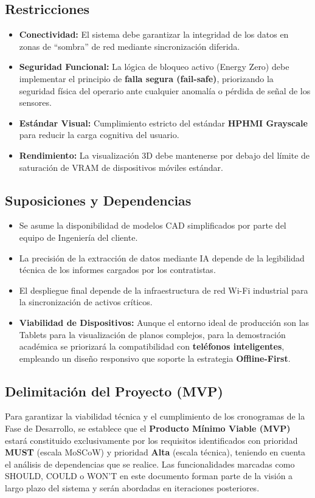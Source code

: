 \subsection{Restricciones}

\begin{itemize}
    \item \textbf{Conectividad:} El sistema debe garantizar la integridad de los datos en zonas de ``sombra'' de red mediante sincronización diferida.
    \item \textbf{Seguridad Funcional:} La lógica de bloqueo activo (Energy Zero) debe implementar el principio de \textbf{falla segura (fail-safe)}, priorizando la seguridad física del operario ante cualquier anomalía o pérdida de señal de los sensores.
    \item \textbf{Estándar Visual:} Cumplimiento estricto del estándar \textbf{HPHMI Grayscale} para reducir la carga cognitiva del usuario.
    \item \textbf{Rendimiento:} La visualización 3D debe mantenerse por debajo del límite de saturación de VRAM de dispositivos móviles estándar.
\end{itemize}
\subsection{Suposiciones y Dependencias}

\begin{itemize}
    \item Se asume la disponibilidad de modelos CAD simplificados por parte del equipo de Ingeniería del cliente.
    \item La precisión de la extracción de datos mediante IA depende de la legibilidad técnica de los informes cargados por los contratistas.
    \item El despliegue final depende de la infraestructura de red Wi-Fi industrial para la sincronización de activos críticos.
    \item \textbf{Viabilidad de Dispositivos:} Aunque el entorno ideal de producción son las Tablets para la visualización de planos complejos, para la demostración académica se priorizará la compatibilidad con \textbf{teléfonos inteligentes}, empleando un diseño responsivo que soporte la estrategia \textbf{Offline-First}.
\end{itemize}
\subsection{Delimitación del Proyecto (MVP)}
Para garantizar la viabilidad técnica y el cumplimiento de los cronogramas de la Fase de Desarrollo, se establece que el \textbf{Producto Mínimo Viable (MVP)} estará constituido exclusivamente por los requisitos identificados con prioridad \textbf{MUST} (escala MoSCoW) y prioridad \textbf{Alta} (escala técnica), teniendo en cuenta el análisis de dependencias que se realice. Las funcionalidades marcadas como SHOULD, COULD o WON'T en este documento forman parte de la visión a largo plazo del sistema y serán abordadas en iteraciones posteriores.

